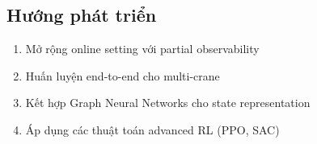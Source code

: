\documentclass[11pt,a4paper]{article}
\theoremstyle{definition}
\begin{document}
\subsection{Hướng phát triển}

\begin{enumerate}
    \item Mở rộng online setting với partial observability
    \item Huấn luyện end-to-end cho multi-crane
    \item Kết hợp Graph Neural Networks cho state representation
    \item Áp dụng các thuật toán advanced RL (PPO, SAC)
\end{enumerate}

% 
% 
\end{document}
